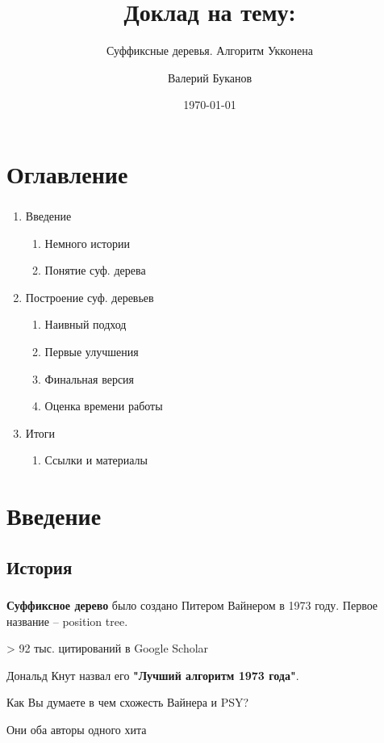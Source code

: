 \documentclass[t]{beamer}  %
\title{Доклад на тему:}
\subtitle{Суффиксные деревья. Алгоритм Укконена}
\author{Валерий Буканов}
\date{\today}
\institute[СПбГУ]{Санкт-Петербургский государственный университет}
\begin{document}
\frame[plain]{\titlepage}	%

\section{Оглавление}
\begin{frame}
	\frametitle{\insertsection}
	\begin{large}
		\begin{enumerate}
			\item Введение 
			\begin{enumerate}
				\item Немного истории
				\item Понятие суф. дерева
			\end{enumerate}
			\item Построение суф. деревьев
			\begin{enumerate}
				\item Наивный подход
				\item Первые улучшения
				\item Финальная версия
				\item Оценка времени работы
			\end{enumerate}
			\item Итоги
			\begin{enumerate}
				\item Ссылки и материалы
			\end{enumerate}
		\end{enumerate}
	\end{large}
\end{frame}


\section{Введение}
\subsection{История}
 
\begin{frame}[c]
	\frametitle{\insertsection} 
	\framesubtitle{\insertsubsection}
	
	\large \textbf{Суффиксное дерево} было создано Питером Вайнером в 1973 году. 	
	Первое название -- position tree. 
	
	> 92 тыс. цитирований в Google Scholar 
	
	Дональд Кнут назвал его \textbf{"Лучший алгоритм 1973 года"}.
	
	\pause
	Как Вы думаете в чем схожесть Вайнера и PSY?
	
	\pause 
	Они оба авторы одного хита
\end{frame}
\end{document}
